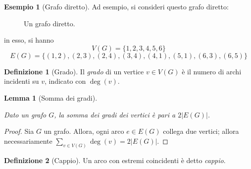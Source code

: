\documentclass[14pt]{extreport}
\newtheorem{lemma}{Lemma}[subsection]
\theoremstyle{definition}
\newtheorem{definition}{Definizione}[subsection]
\theoremstyle{definition}
\newtheorem{example}{Esempio}[subsection]
\begin{document}
\begin{example}[Grafo diretto]
    Ad esempio, si consideri questo grafo diretto:

    \begin{figure}[H]
        \centering
        \caption{Un grafo diretto.}
    \end{figure}

    in esso, si hanno $$V(G) = \{1, 2, 3, 4, 5, 6\}$$ $$E(G) = \{(1, 2), (2, 3), (2, 4), (3, 4), (4, 1), (5, 1), (6, 3), (6, 5)\}$$
\end{example}

\begin{definition}[Grado]
    Il \textit{grado} di un vertice $v \in V(G)$ è il numero di archi incidenti su $v$, indicato con $\deg(v)$.
\end{definition}

\begin{lemma}[Somma dei gradi]
    \label{Somma dei gradi}

    Dato un grafo $G$, la somma dei gradi dei vertici è pari a $2 |E(G)|$.
\end{lemma}

\begin{proof}
    Sia $G$ un grafo. Allora, ogni arco $e \in E(G)$ collega due vertici; allora necessariamente $\displaystyle \sum_{v \in V(G)}{\deg(v)} = 2 |E(G)|$.
\end{proof}

\begin{definition}[Cappio]
    Un arco con estremi coincidenti è detto \textit{cappio}.
\end{definition}
\end{document}
